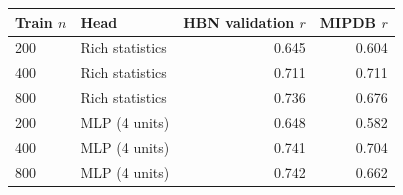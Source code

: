 \begin{tabular}{llrr}
\toprule
Train $n$ & Head & HBN validation $r$ & MIPDB $r$ \\
\midrule
200 & Rich statistics & 0.645 & 0.604 \\
400 & Rich statistics & 0.711 & 0.711 \\
800 & Rich statistics & 0.736 & 0.676 \\
200 & MLP (4 units) & 0.648 & 0.582 \\
400 & MLP (4 units) & 0.741 & 0.704 \\
800 & MLP (4 units) & 0.742 & 0.662 \\
\bottomrule
\end{tabular}
